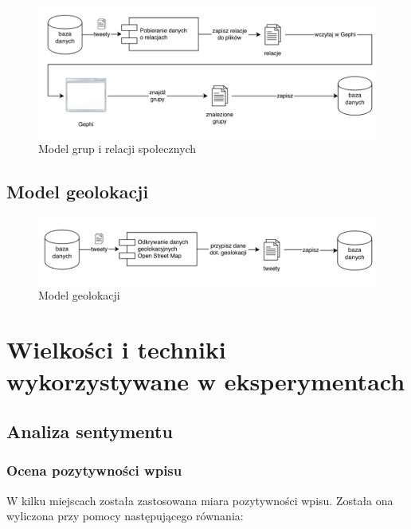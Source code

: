 \begin{figure}[ht!]
\centering
\includegraphics[width=160mm]{img/odkrywanie-relacji.png}
\caption{Model grup i relacji społecznych}
\label{image:odkrywanie-relacji}
\end{figure}

\subsection{Model geolokacji}
\label{subsection:modelgeolokacji}



\begin{figure}[ht!]
\centering
\includegraphics[width=160mm]{img/odkrywanie-geolokacji.png}
\caption{Model geolokacji}
\label{image:odkrywanie-geolokacji}
\end{figure}





\section{Wielkości i techniki wykorzystywane w eksperymentach}
\label{section:wielkosciwykorzystywane}
\subsection{Analiza sentymentu}
\subsubsection{Ocena pozytywności wpisu}
\label{subsection:ocenapozytywnosci}
W kilku miejscach została zastosowana miara pozytywności wpisu.
Została ona wyliczona przy pomocy następującego równania:

